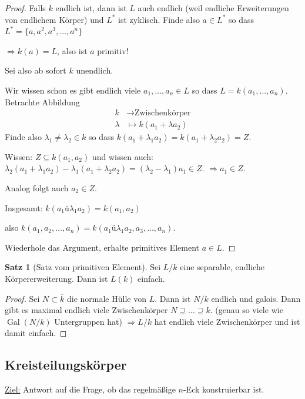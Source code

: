 \documentclass[12pt,parskip=full]{scrartcl}
\newcommand{\heading}{\underline}
\DeclareMathOperator{\Gal}{Gal}
\theoremstyle{definition}
\newtheorem{theorem}{Satz}[section]
\theoremstyle{remark}
\begin{document}
\begin{proof}
		Falls $k$ endlich ist, dann ist $L$ auch endlich (weil endliche Erweiterungen von endlichem Körper) und $L^*$ ist zyklisch. Finde also $a \in L^*$ so dass $L^* = \{ a, a^2, a^3, \dots, a^n \}$
		
		$\Rightarrow k(a) = L$, also ist $a$ primitiv!
		
		Sei also ab sofort $k$ unendlich.
		
		Wir wissen schon es gibt endlich viele $a_1, \dots, a_n \in L$ so dass $L = k(a_1, \dots, a_n)$. Betrachte Abbildung
		\begin{align*}
			k &\longrightarrow \text{Zwischenkörper} \\
			\lambda &\longmapsto k(a_1 + \lambda a_2)
		\end{align*}
		Finde also $\lambda_1 \neq \lambda_2 \in k$ so dass $k(a_1 + \lambda_1 a_2) = k(a_1 + \lambda_2 a_2) = Z$.
		
		Wissen: $Z \subseteq k(a_1, a_2)$ und wissen auch: $\lambda_2(a_1 + \lambda_1 a_2) - \lambda_1(a_1 + \lambda_2 a_2) = (\lambda_2 - \lambda_1) a_1 \in Z$. $\Rightarrow a_1 \in Z$.
		
		Analog folgt auch $a_2 \in Z$.
		
		Insgesamt: $k(a_1 ü \lambda_1 a_2) = k(a_1, a_2)$
		
		also $k(a_1, a_2, \dots, a_n) = k(a_1 ü \lambda_1 a_2, a_3, \dots, a_n)$.
		
		Wiederhole das Argument, erhalte primitives Element $a \in L$.
	\end{proof}

	\begin{theorem}[Satz vom primitiven Element]
		Sei $L/k$ eine separable, endliche Körpererweiterung. Dann ist $L(k)$ einfach.
	\end{theorem}

	\begin{proof}
		Sei $N \subset \overline{k}$ die normale Hülle von $L$. Dann ist $N/k$ endlich und galois. Dann gibt es maximal endlich viele Zwischenkörper $N \supseteq \dots \supseteq k$. (genau so viele wie $\Gal(N/k)$ Untergruppen hat) $\Rightarrow L/k$ hat endlich viele Zwischenkörper und ist damit einfach.
	\end{proof}

	\subsection{Kreisteilungskörper}
	
	\heading{Ziel:} Antwort auf die Frage, ob das regelmäßige $n$-Eck konstruierbar ist.
	
\end{document}
